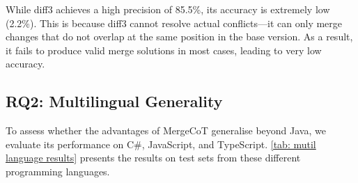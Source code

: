 \documentclass[sigconf,review,anonymous]{acmart}
\begin{document}
While diff3 achieves a high precision of 85.5\%, its accuracy is extremely low (2.2\%). This is because diff3 cannot resolve actual conflicts—it can only merge changes that do not overlap at the same position in the base version. As a result, it fails to produce valid merge solutions in most cases, leading to very low accuracy.

\subsection{RQ2: Multilingual Generality}
To assess whether the advantages of MergeCoT generalise beyond Java, we evaluate its performance on C\#, JavaScript, and TypeScript. \autoref{tab: mutil language results} presents the results on test sets from these different programming languages.

\end{document}
